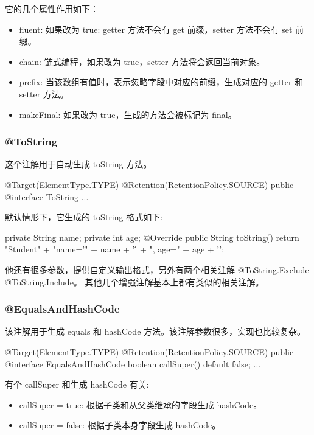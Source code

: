 它的几个属性作用如下：
\begin{itemize}
    \item fluent: 如果改为 true: getter 方法不会有 get 前缀，setter 方法不会有 set 前缀。
    \item chain: 链式编程，如果改为 true，setter 方法将会返回当前对象。
    \item prefix: 当该数组有值时，表示忽略字段中对应的前缀，生成对应的 getter 和 setter 方法。
    \item makeFinal: 如果改为 true，生成的方法会被标记为 final。
\end{itemize}

\subsubsection{@ToString}

这个注解用于自动生成 toString 方法。

\begin{Java}
@Target(ElementType.TYPE)
@Retention(RetentionPolicy.SOURCE)
public @interface ToString {
    ...
}
\end{Java}

默认情形下，它生成的 toString 格式如下:

\begin{Java}
private String name;
private int age;
@Override
public String toString() {
    return "Student{" +
            "name='" + name + '\'' +
            ", age=" + age +
            '}';
}
\end{Java}

他还有很多参数，提供自定义输出格式，另外有两个相关注解 @ToString.Exclude @ToString.Include。 其他几个增强注解基本上都有类似的相关注解。

\subsubsection{@EqualsAndHashCode}

该注解用于生成 equals 和 hashCode 方法。该注解参数很多，实现也比较复杂。

\begin{Java}
@Target(ElementType.TYPE)
@Retention(RetentionPolicy.SOURCE)
public @interface EqualsAndHashCode {
    boolean callSuper() default false;
    ...
}
\end{Java}

有个 callSuper 和生成 hashCode 有关:
\begin{itemize}
    \item callSuper = true: 根据子类和从父类继承的字段生成 hashCode。
    \item callSuper = false: 根据子类本身字段生成 hashCode。
\end{itemize}

